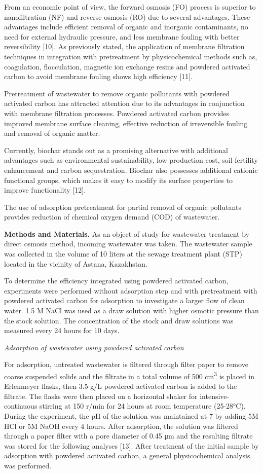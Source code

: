 From an economic point of view, the forward osmosis (FO) process is
superior to nanofiltration (NF) and reverse osmosis (RO) due to several
advantages. These advantages include efficient removal of organic and
inorganic contaminants, no need for external hydraulic pressure, and
less membrane fouling with better reversibility {[}10{]}. As previously
stated, the application of membrane filtration techniques in integration
with pretreatment by physicochemical methods such as, coagulation,
flocculation, magnetic ion exchange resins and powdered activated carbon
to avoid membrane fouling shows high efficiency {[}11{]}.

Pretreatment of wastewater to remove organic pollutants with powdered
activated carbon has attracted attention due to its advantages in
conjunction with membrane filtration processes. Powdered activated
carbon provides improved membrane surface cleaning, effective reduction
of irreversible fouling and removal of organic matter.

Currently, biochar stands out as a promising alternative with additional
advantages such as environmental sustainability, low production cost,
soil fertility enhancement and carbon sequestration. Biochar also
possesses additional cationic functional groups, which makes it easy to
modify its surface properties to improve functionality {[}12{]}.

The use of adsorption pretreatment for partial removal of organic
pollutants provides reduction of chemical oxygen demand (COD) of
wastewater.

{\bfseries Methods and Materials.} As an object of study for wastewater
treatment by direct osmosis method, incoming wastewater was taken. The
wastewater sample was collected in the volume of 10 liters at the sewage
treatment plant (STP) located in the vicinity of Astana, Kazakhstan.

To determine the efficiency integrated using powdered activated carbon,
experiments were performed without adsorption step and with pretreatment
with powdered activated carbon for adsorption to investigate a larger
flow of clean water. 1.5 M NaCl was used as a draw solution with higher
osmotic pressure than the stock solution. The concentration of the stock
and draw solutions was measured every 24 hours for 10 days.

\emph{Adsorption of wastewater using powdered activated carbon}

For adsorption, untreated wastewater is filtered through filter paper to
remove coarse suspended solids and the filtrate in a total volume of 500
cm\textsuperscript{3} is placed in Erlenmeyer flasks, then 3.5 g/L
powdered activated carbon is added to the filtrate. The flasks were then
placed on a horizontal shaker for intensive-continuous stirring at 150
r/min for 24 hours at room temperature (25-28°C). During the experiment,
the pH of the solution was maintained at 7 by adding 5M HCl or 5M NaOH
every 4 hours. After adsorption, the solution was filtered through a
paper filter with a pore diameter of 0.45 μm and the resulting filtrate
was stored for the following analyses {[}13{]}. After treatment of the
initial sample by adsorption with powdered activated carbon, a general
physicochemical analysis was performed.

